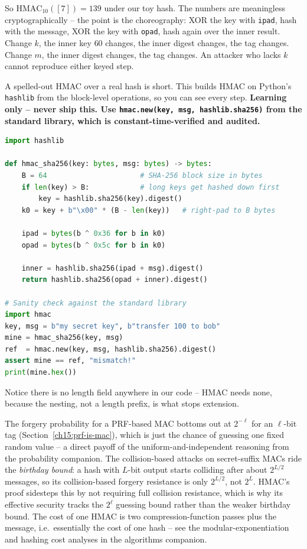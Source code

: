 So $\mathrm{HMAC}_{10}([7]) = 139$ under our toy hash. The numbers are meaningless cryptographically -- the point is the choreography: XOR the key with \texttt{ipad}, hash with the message, XOR the key with \texttt{opad}, hash again over the inner result. Change $k$, the inner key $60$ changes, the inner digest changes, the tag changes. Change $m$, the inner digest changes, the tag changes. An attacker who lacks $k$ cannot reproduce either keyed step.

\begin{implementbox}
A spelled-out HMAC over a real hash is short. This builds HMAC on Python's \texttt{hashlib} from the block-level operations, so you can see every step. \textbf{Learning only -- never ship this. Use \texttt{hmac.new(key, msg, hashlib.sha256)} from the standard library, which is constant-time-verified and audited.}
\begin{lstlisting}[language=Python]
import hashlib

def hmac_sha256(key: bytes, msg: bytes) -> bytes:
    B = 64                      # SHA-256 block size in bytes
    if len(key) > B:            # long keys get hashed down first
        key = hashlib.sha256(key).digest()
    k0 = key + b"\x00" * (B - len(key))   # right-pad to B bytes

    ipad = bytes(b ^ 0x36 for b in k0)
    opad = bytes(b ^ 0x5c for b in k0)

    inner = hashlib.sha256(ipad + msg).digest()
    return hashlib.sha256(opad + inner).digest()

# Sanity check against the standard library
import hmac
key, msg = b"my secret key", b"transfer 100 to bob"
mine = hmac_sha256(key, msg)
ref  = hmac.new(key, msg, hashlib.sha256).digest()
assert mine == ref, "mismatch!"
print(mine.hex())
\end{lstlisting}
Notice there is no length field anywhere in our code -- HMAC needs none, because the nesting, not a length prefix, is what stops extension.
\end{implementbox}

\begin{connectionbox}
The forgery probability for a PRF-based MAC bottoms out at $2^{-\ell}$ for an $\ell$-bit tag (Section~\ref{ch15:prf-is-mac}), which is just the chance of guessing one fixed random value -- a direct payoff of the uniform-and-independent reasoning from the probability companion. The collision-based attacks on secret-suffix MACs ride the \emph{birthday bound}: a hash with $L$-bit output starts colliding after about $2^{L/2}$ messages, so its collision-based forgery resistance is only $2^{L/2}$, not $2^{L}$. HMAC's proof sidesteps this by not requiring full collision resistance, which is why its effective security tracks the $2^{\ell}$ guessing bound rather than the weaker birthday bound. The cost of one HMAC is two compression-function passes plus the message, i.e.\ essentially the cost of one hash -- see the modular-exponentiation and hashing cost analyses in the algorithms companion.
\end{connectionbox}

